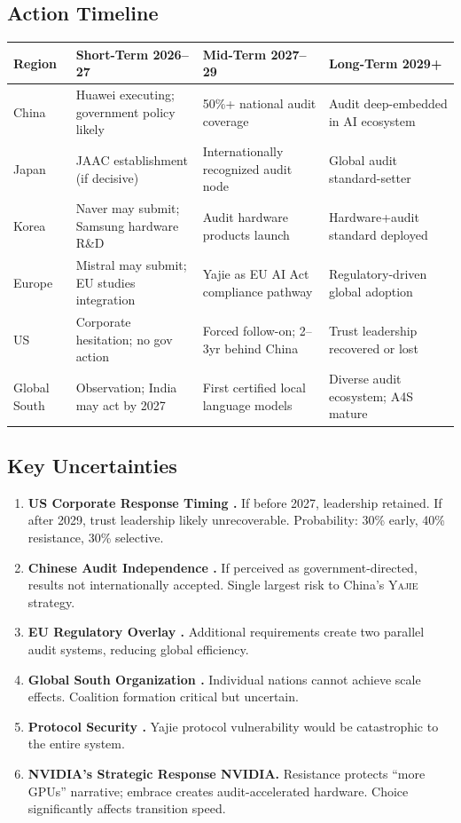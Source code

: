 \documentclass[11pt,a4paper]{article}
\theoremstyle{definition}
\theoremstyle{remark}
\newcommand{\Yajie}{\textsc{Yajie}}
\begin{document}
\subsection{Action Timeline}
\begin{center}
\begin{tabular}{lp{3.5cm}p{3.5cm}p{3.5cm}}
\toprule
\textbf{Region } & \textbf{Short-Term  2026--27} & \textbf{Mid-Term  2027--29} & \textbf{Long-Term  2029+} \\
\midrule
China  & Huawei executing; government policy likely & 50\%+ national audit coverage & Audit deep-embedded in AI ecosystem \\
Japan  & JAAC establishment (if decisive) & Internationally recognized audit node & Global audit standard-setter \\
Korea  & Naver may submit; Samsung hardware R\&D & Audit hardware products launch & Hardware+audit standard deployed \\
Europe  & Mistral may submit; EU studies integration & Yajie as EU AI Act compliance pathway & Regulatory-driven global adoption \\
US  & Corporate hesitation; no gov action & Forced follow-on; 2--3yr behind China & Trust leadership recovered or lost \\
Global South  & Observation; India may act by 2027 & First certified local language models & Diverse audit ecosystem; A4S mature \\
\bottomrule
\end{tabular}
\end{center}
\subsection{Key Uncertainties}
\begin{enumerate}[label=\textbf{U\arabic*:}, leftmargin=*]
    \item \textbf{US Corporate Response Timing .} If before 2027, leadership retained. If after 2029, trust leadership likely unrecoverable. Probability: 30\% early, 40\% resistance, 30\% selective.
    \item \textbf{Chinese Audit Independence .} If perceived as government-directed, results not internationally accepted. Single largest risk to China's \Yajie{} strategy.
    \item \textbf{EU Regulatory Overlay .} Additional requirements create two parallel audit systems, reducing global efficiency.
    \item \textbf{Global South Organization .} Individual nations cannot achieve scale effects. Coalition formation critical but uncertain.
    \item \textbf{Protocol Security .} Yajie protocol vulnerability would be catastrophic to the entire system.
    \item \textbf{NVIDIA's Strategic Response NVIDIA.} Resistance protects ``more GPUs'' narrative; embrace creates audit-accelerated hardware. Choice significantly affects transition speed.
\end{enumerate}
\end{document}
